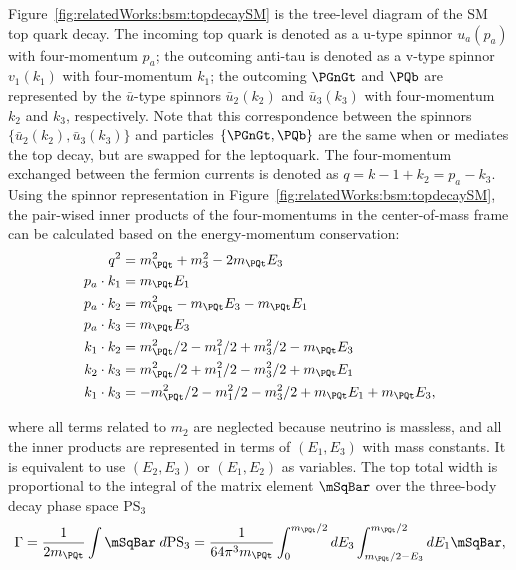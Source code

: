 Figure~\ref{fig:relatedWorks:bsm:topdecaySM} is the tree-level diagram of the SM top quark decay. The incoming top quark is denoted as a u-type spinnor $u_a(p_a)$ with four-momentum $p_a$; the outcoming anti-tau is denoted as a v-type spinnor $v_1(k_1)$ with four-momentum $k_1$; the outcoming  $\PGnGt$ and $\PQb$ are represented by the $\bar{u}$-type spinnors $\bar{u}_2(k_2)$ and $\bar{u}_3(k_3)$ with four-momentum $k_2$ and $k_3$, respectively. Note that this correspondence between the spinnors $\{ \bar{u}_2(k_2), \bar{u}_3(k_3)\}$ and particles $\{\PGnGt, \PQb\}$ are the same when \PWpr or \PSHp mediates the top decay, but are swapped for the leptoquark. The four-momentum exchanged between the fermion currents is denoted as $q=k-1+k_2 = p_a - k_3$. Using the spinnor representation in Figure~\ref{fig:relatedWorks:bsm:topdecaySM}, the pair-wised inner products of the four-momentums in the center-of-mass frame can be calculated based on the energy-momentum conservation:
\begin{equation}
\begin{split}
	q^2 &=  m_\PQt^2 + m_3^2  -2 m_\PQt E_3  \\
    p_a \cdot k_1 &= m_\PQt E_1 \\
    p_a \cdot k_2 &= m_\PQt^2  -m_\PQt E_3-m_\PQt E_1  \\
    p_a \cdot k_3 &= m_\PQt E_3 \\
    k_1 \cdot k_2 &= m_\PQt^2/2 - m_1^2/2 + m_3^2/2 - m_\PQt E_3 \\
    k_2\cdot k_3 &=  m_\PQt^2/2 + m_1^2/2 - m_3^2/2 + m_\PQt E_1 \\
    k_1\cdot k_3 &=   -m_\PQt^2/2 - m_1^2/2 - m_3^2/2 + m_\PQt E_1 + m_\PQt E_3 ,
\end{split}
\label{eqn:relatedWorks:bsm:innerProduct}
\end{equation}

\noindent where all terms related to $m_2$ are neglected because neutrino is massless, and all the inner products are represented in terms of $ ( E_1,E_3 )$ with mass constants. It is equivalent to use $ ( E_2,E_3 )$ or $ ( E_1,E_2 )$ as variables. The top total width is proportional to the integral of the matrix element $\mSqBar $ over the three-body decay phase space $\mathrm{PS_3}$
\begin{equation}
	\Gamma = \frac{1}{2 m_\PQt} \int \mSqBar \; d\mathrm{PS_3} = \frac{1}{64 \pi^3 m_\PQt} \int_{0}^{m_\PQt/2} dE_3 \int_{m_\PQt/2-E_3}^{m_\PQt/2} dE_1 \mSqBar ,
    \label{eqn:relatedWorks:bsm:decayWidth}
\end{equation}




